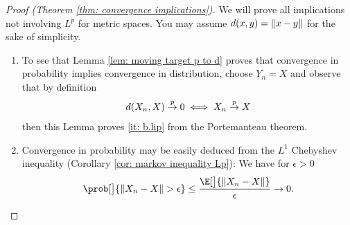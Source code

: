 \begin{proof}[Proof (Theorem \ref{thm: convergence implications})]
    We will prove all implications not involving \(L^p\) for metric spaces. You
    may assume \(d(x,y) = \lVert x-y\rVert\) for the sake of simplicity.
    \begin{enumerate}[wide=0pt]
        \item[\ref{it: p to d}] To see that Lemma \ref{lem: moving target p to d}
        proves that convergence in probability implies convergence in distribution,
        choose \(Y_n = X\) and observe that by definition
        \[
            d(X_n, X) \overset{p}\to 0 \iff X_n \overset{p}\to X
        \]
        then this Lemma proves \ref{it: b.lip} from the Portemanteau theorem.

        \item[\ref{it: L1 to p}] Convergence in probability may be easily deduced
        from the \(L^1\) Chebyshev inequality (Corollary
        \ref{cor: markov inequality Lp}): We have for \(\epsilon > 0\) \[
            \prob[\big]{\norm{X_n - X} > \epsilon}
            \le \frac{\E[\big]{\norm{X_n - X}}}{\epsilon}
            \to 0.
        \]


\end{enumerate}
\end{proof}
